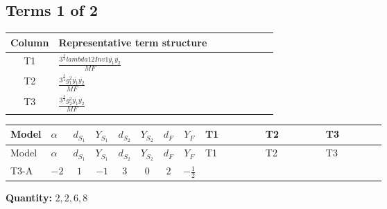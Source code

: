 \documentclass[8pt]{article}
\begin{document}
\begin{landscape}
\subsection*{Terms 1 of 2}
\begin{center}
\begin{tabular}{@{}c >{\raggedright\arraybackslash}p{0.82\linewidth}@{}}
\toprule
Column & Representative term structure \\
\midrule
T1 & \(\displaystyle \frac{3^{\frac{3}{4}} lambda12Inv1 \overline{y_{1}} \overline{y_{2}}}{MF}\) \\
\midrule
T2 & \(\displaystyle \frac{3^{\frac{3}{4}} g_{1}^{2} \overline{y_{1}} \overline{y_{2}}}{MF}\) \\
\midrule
T3 & \(\displaystyle \frac{3^{\frac{3}{4}} g_{2}^{2} \overline{y_{1}} \overline{y_{2}}}{MF}\) \\
\midrule
\bottomrule
\end{tabular}
\end{center}
\smallskip
\tiny
\begin{longtable}{@{}llcccccc >{\raggedright\arraybackslash}p{0.21\linewidth} >{\raggedright\arraybackslash}p{0.21\linewidth} >{\raggedright\arraybackslash}p{0.21\linewidth}@{}}
\toprule
Model & $\alpha$ & $d_{S_1}$ & $Y_{S_1}$ & $d_{S_2}$ & $Y_{S_2}$ & $d_F$ & $Y_F$ & T1 & T2 & T3 \\
\midrule
\endfirsthead
\toprule
Model & $\alpha$ & $d_{S_1}$ & $Y_{S_1}$ & $d_{S_2}$ & $Y_{S_2}$ & $d_F$ & $Y_F$ & T1 & T2 & T3 \\
\midrule
\endhead
T3-A & $-2$ & $1$ & $-1$ & $3$ & $0$ & $2$ & $-\frac{1}{2}$ & \scriptsize\adjustbox{max width=\linewidth}{$\begin{gathered} \frac{3^{\frac{3}{4}} lambda12Inv1 \overline{y_{1}} \overline{y_{2}}}{6 MF}\end{gathered}$} & \scriptsize\adjustbox{max width=\linewidth}{$\begin{gathered} \frac{3^{\frac{3}{4}} g_{1}^{2} \overline{y_{1}} \overline{y_{2}}}{8 MF}\end{gathered}$} & \scriptsize\adjustbox{max width=\linewidth}{$\begin{gathered} \frac{17 \cdot 3^{\frac{3}{4}} g_{2}^{2} \overline{y_{1}} \overline{y_{2}}}{24 MF}\end{gathered}$} \\
\midrule
\bottomrule
\end{longtable}
\clearpage
\noindent\textbf{Quantity: }$\mathrm{2,2,6,8}$\par\smallskip

\end{landscape}
\end{document}
